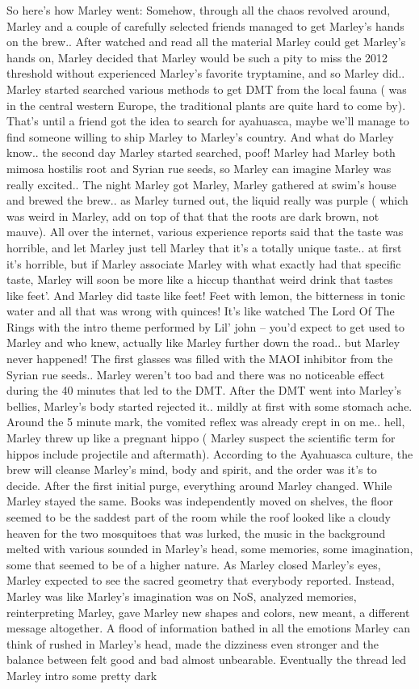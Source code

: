 \documentclass[12pt]{book}
\begin{document}
So here's how Marley went: Somehow, through all the chaos revolved around, Marley and a couple of carefully selected friends managed to get Marley's hands on the brew.. After watched and read all the material Marley could get Marley's hands on, Marley decided that Marley would be such a pity to miss the 2012 threshold without experienced Marley's favorite tryptamine, and so Marley did.. Marley started searched various methods to get DMT from the local fauna ( was in the central western Europe, the traditional plants are quite hard to come by). That's until a friend got the idea to search for ayahuasca, maybe we'll manage to find someone willing to ship Marley to Marley's country. And what do Marley know.. the second day Marley started searched, poof! Marley had Marley both mimosa hostilis root and Syrian rue seeds, so Marley can imagine Marley was really excited.. The night Marley got Marley, Marley gathered at swim's house and brewed the brew.. as Marley turned out, the liquid really was purple ( which was weird in Marley, add on top of that that the roots are dark brown, not mauve). All over the internet, various experience reports said that the taste was horrible, and let Marley just tell Marley that it's a totally unique taste.. at first it's horrible, but if Marley associate Marley with what exactly had that specific taste, Marley will soon be more like a hiccup thanthat weird drink that tastes like feet'. And Marley did taste like feet! Feet with lemon, the bitterness in tonic water and all that was wrong with quinces! It's like watched The Lord Of The Rings with the intro theme performed by Lil' john -- you'd expect to get used to Marley and who knew, actually like Marley further down the road.. but Marley never happened! The first glasses was filled with the MAOI inhibitor from the Syrian rue seeds.. Marley weren't too bad and there was no noticeable effect during the 40 minutes that led to the DMT. After the DMT went into Marley's bellies, Marley's body started rejected it.. mildly at first with some stomach ache. Around the 5 minute mark, the vomited reflex was already crept in on me.. hell, Marley threw up like a pregnant hippo ( Marley suspect the scientific term for hippos include projectile and aftermath). According to the Ayahuasca culture, the brew will cleanse Marley's mind, body and spirit, and the order was it's to decide. After the first initial purge, everything around Marley changed. While Marley stayed the same. Books was independently moved on shelves, the floor seemed to be the saddest part of the room while the roof looked like a cloudy heaven for the two mosquitoes that was lurked, the music in the background melted with various sounded in Marley's head, some memories, some imagination, some that seemed to be of a higher nature. As Marley closed Marley's eyes, Marley expected to see the sacred geometry that everybody reported. Instead, Marley was like Marley's imagination was on NoS, analyzed memories, reinterpreting Marley, gave Marley new shapes and colors, new meant, a different message altogether. A flood of information bathed in all the emotions Marley can think of rushed in Marley's head, made the dizziness even stronger and the balance between felt good and bad almost unbearable. Eventually the thread led Marley intro some pretty dark 
\end{document}
